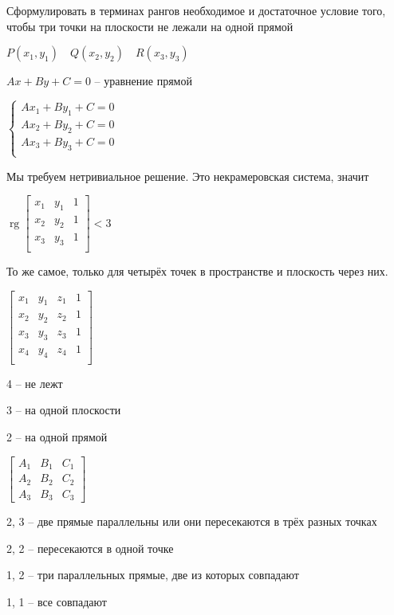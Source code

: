 \documentclass{book}
\DeclareMathOperator{\rg}{rg}
\theoremstyle{definition}
\begin{document}
\begin{problem}
    Сформулировать в терминах рангов необходимое и достаточное условие того, чтобы три точки на плоскости не лежали на одной прямой

    $P(x_1, y_1)\quad Q(x_2, y_2)\quad R\left( x_3, y_3 \right) $

    $Ax+By+C = 0$ -- уравнение прямой

    $\begin{cases}
        Ax_1+By_1+C = 0\\
        Ax_2+By_2+C = 0\\
        Ax_3+By_3+C = 0\\
    \end{cases}$ 

    Мы требуем нетривиальное решение. Это некрамеровская система, значит

    $\rg \begin{bmatrix} x_1&y_1&1\\x_2&y_2&1\\x_3&y_3&1\\ \end{bmatrix} <3$
\end{problem}

\begin{problem}
    То же самое, только для четырёх точек в пространстве и плоскость через них.

    $\begin{bmatrix} x_1&y_1&z_1&1\\ x_2&y_2&z_2&1\\x_3&y_3&z_3&1\\ x_4&y_4&z_4&1\\  \end{bmatrix} $

    4 -- не лежт

    3 -- на одной плоскости

    2 -- на одной прямой
\end{problem}

\begin{problem}
$\left[\begin{array}{cc|c} A_1&B_1&C_1\\A_2&B_2&C_2\\A_3&B_3&C_3 \end{array}\right] $ 


    2, 3 -- две прямые параллельны или они пересекаются в трёх разных точках

    2, 2 -- пересекаются в одной точке

    1, 2 -- три параллельных прямые, две из которых совпадают

    1, 1 -- все совпадают
\end{problem}





















    
\end{document}
